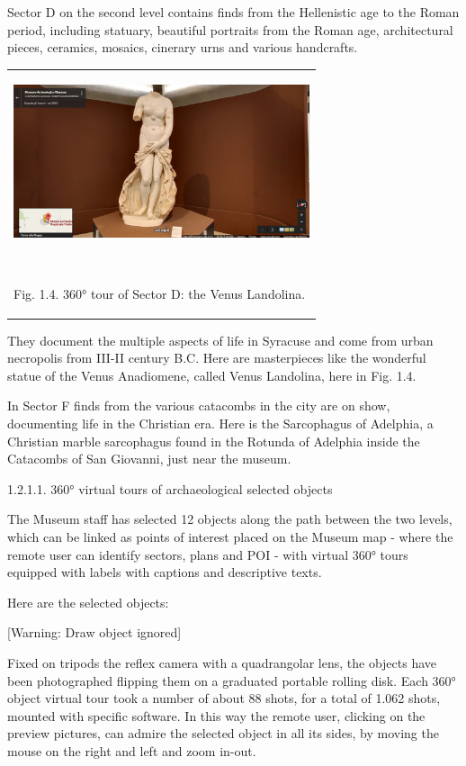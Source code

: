 \documentclass[amsthm,ebook]{saparticle}
\begin{document}
Sector D on the second level contains finds from the Hellenistic age to the Roman period, including statuary, beautiful
portraits from the Roman age, architectural pieces, ceramics, mosaics, cinerary urns and various handcrafts. 

\begin{flushleft}
\tablefirsthead{}
\tablehead{}
\tabletail{}
\tablelasttail{}
\begin{supertabular}{m{10.681cm}}
{\centering  \includegraphics[width=8.708cm,height=4.521cm]{EAGLE2016BONACINIPilotprojectatPaoloOrsiMuseum-img004.jpg}
\par}

~

Fig. 1.4. 360° tour of Sector D: the Venus Landolina. \\
\end{supertabular}
\end{flushleft}
They document the multiple aspects of life in Syracuse and come from urban necropolis from III-II century B.C. Here are
masterpieces like the wonderful statue of the Venus Anadiomene, called Venus Landolina, here in Fig. 1.4.

In Sector F finds from the various catacombs in the city are on show, documenting life in the Christian era. Here is the
Sarcophagus of Adelphia, a Christian marble sarcophagus found in the Rotunda of Adelphia inside the Catacombs of San
Giovanni, just near the museum.


\bigskip

1.2.1.1. 360° virtual tours of archaeological selected objects

The Museum staff has selected 12 objects along the path between the two levels, which can be linked as points of
interest placed on the Museum map - where the remote user can identify sectors, plans and POI - with virtual 360° tours
equipped with labels with captions and descriptive texts.

Here are the selected objects:

[Warning: Draw object ignored]

Fixed on tripods the reflex camera with a quadrangolar lens, the objects have been photographed flipping them on a
graduated portable rolling disk. Each 360° object virtual tour took a number of about 88 shots, for a total of 1.062
shots, mounted with specific software. In this way the remote user, clicking on the preview pictures, can admire the
selected object in all its sides, by moving the mouse on the right and left and zoom in-out.
\end{document}
